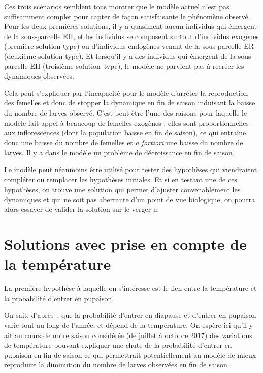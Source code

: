 Ces trois scénarios semblent tous montrer que le modèle actuel n'est pas suffisamment complet pour capter de façon satisfaisante le phénomène observé.
Pour les deux premières solutions, il y a quasiment aucun individus qui émergent de la sous-parcelle EH, et les individus se composent surtout d'individus exogènes (première solution-type) ou d'individus endogènes venant de la sous-parcelle ER (deuxième solution-type).
Et lorsqu'il y a des individus qui émergent de la sous-parcelle EH (troisième solution--type), le modèle ne parvient pas à recréer les dynamiques observées.

Cela peut s'expliquer par l'incapacité pour le modèle d'arrêter la reproduction des femelles et donc de stopper la dynamique en fin de saison induisant la baisse du nombre de larves observé.
C'est peut-être l'une des raisons pour laquelle le modèle fait appel  à beaucoup de femelles exogènes : elles sont proportionnelles aux inflorescences (dont la population baisse en fin de saison), ce qui entraîne donc une baisse du nombre de femelles et \emph{a fortiori} une baisse du nombre de larves.
Il y a dans le modèle un problème de décroissance en fin de saison.

Le modèle peut néanmoins être utilisé pour tester des hypothèses qui viendraient compléter ou remplacer les hypothèses initiales.
Et si en testant une de ces hypothèses, on trouve une solution qui permet d'ajuster convenablement les dynamiques et qui ne soit pas aberrante d'un point de vue biologique, on pourra alors essayer de valider la solution sur le verger n.


 
 \clearpage

\section{Solutions avec prise en compte de la température}

La première hypothèse à laquelle on s'intéresse est le lien entre la température et la probabilité d'entrer en pupaison.

On sait, d'après~\citet{pauldiap}, que la probabilité d'entrer en diapause et d'entrer en pupaison varie tout au long de l'année, et dépend de la température.
On espère ici qu'il y ait au cours de notre saison considérée (de juillet à octobre 2017) des variations de température pouvant expliquer une chute de la probabilité d'entrer en pupaison en fin de saison ce qui permettrait potentiellement au modèle de mieux reproduire la diminution du nombre de larves observées en fin de saison.

